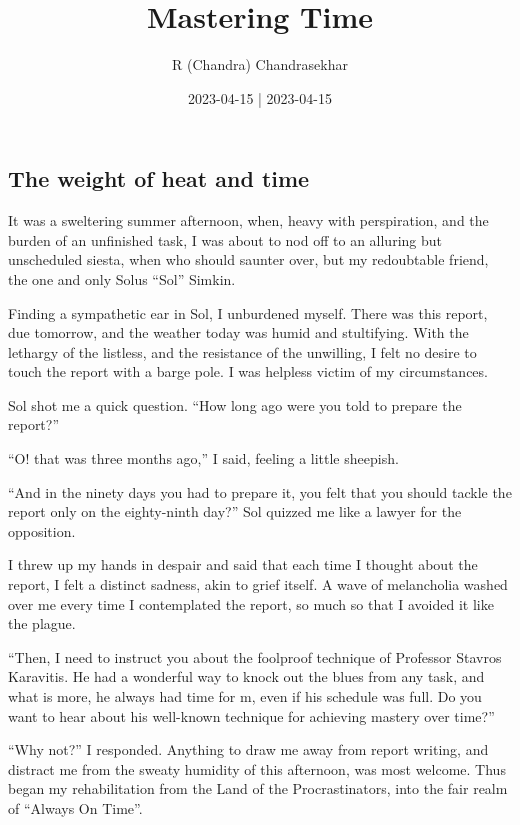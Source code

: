 \documentclass[
  a4paper,
]{article}
\title{Mastering Time}
\author{R (Chandra) Chandrasekhar}
\date{2023-04-15 | 2023-04-15}
\begin{document}
\maketitle

\thispagestyle{empty}


\hypertarget{the-weight-of-heat-and-time}{%
\subsection{The weight of heat and
time}\label{the-weight-of-heat-and-time}}

It was a sweltering summer afternoon, when, heavy with perspiration, and
the burden of an unfinished task, I was about to nod off to an alluring
but unscheduled siesta, when who should saunter over, but my redoubtable
friend, the one and only Solus ``Sol'' Simkin.

Finding a sympathetic ear in Sol, I unburdened myself. There was this
report, due tomorrow, and the weather today was humid and stultifying.
With the lethargy of the listless, and the resistance of the unwilling,
I felt no desire to touch the report with a barge pole. I was helpless
victim of my circumstances.

Sol shot me a quick question. ``How long ago were you told to prepare
the report?''

``O! that was three months ago,'' I said, feeling a little sheepish.

``And in the ninety days you had to prepare it, you felt that you should
tackle the report only on the eighty-ninth day?'' Sol quizzed me like a
lawyer for the opposition.

I threw up my hands in despair and said that each time I thought about
the report, I felt a distinct sadness, akin to grief itself. A wave of
melancholia washed over me every time I contemplated the report, so much
so that I avoided it like the plague.

``Then, I need to instruct you about the foolproof technique of
Professor Stavros Karavitis. He had a wonderful way to knock out the
blues from any task, and what is more, he always had time for m, even if
his schedule was full. Do you want to hear about his well-known
technique for achieving mastery over time?''

``Why not?'' I responded. Anything to draw me away from report writing,
and distract me from the sweaty humidity of this afternoon, was most
welcome. Thus began my rehabilitation from the Land of the
Procrastinators, into the fair realm of ``Always On Time''.
\end{document}
